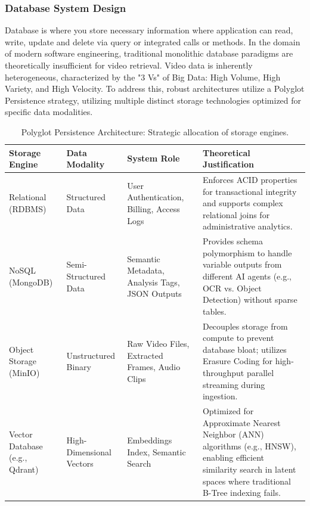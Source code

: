 \subsubsection{Database System Design}
Database is where you store necessary information where application can read, write, update and delete via query or integrated calls or methods. In the domain of modern software engineering, traditional monolithic database paradigms are theoretically insufficient for video retrieval. Video data is inherently heterogeneous, characterized by the "3 Vs" of Big Data: High Volume, High Variety, and High Velocity. To address this, robust architectures utilize a Polyglot Persistence strategy, utilizing multiple distinct storage technologies optimized for specific data modalities.

\begin{table}[h]
    \centering
    \caption{Polyglot Persistence Architecture: Strategic allocation of storage engines.}
    \label{tab:polyglot_db}
    \renewcommand{\arraystretch}{1.5} %
    \small %
    \begin{tabularx}{\textwidth}{|p{2.0cm}|p{2.0cm}|X|X|}
    \hline
    \textbf{Storage Engine} & \textbf{Data Modality} & \textbf{System Role} & \textbf{Theoretical Justification} \\
    \hline
    Relational (RDBMS) & Structured Data & User Authentication, Billing, Access Logs & Enforces ACID properties for transactional integrity and supports complex relational joins for administrative analytics. \\
    \hline
    NoSQL (MongoDB) & Semi-Structured Data & Semantic Metadata, Analysis Tags, JSON Outputs & Provides schema polymorphism to handle variable outputs from different AI agents (e.g., OCR vs. Object Detection) without sparse tables. \\
    \hline
    Object Storage (MinIO) & Unstructured Binary & Raw Video Files, Extracted Frames, Audio Clips & Decouples storage from compute to prevent database bloat; utilizes Erasure Coding for high-throughput parallel streaming during ingestion. \\
    \hline
    Vector Database (e.g., Qdrant) & High-Dimensional Vectors & Embeddings Index, Semantic Search & Optimized for Approximate Nearest Neighbor (ANN) algorithms (e.g., HNSW), enabling efficient similarity search in latent spaces where traditional B-Tree indexing fails. \\
    \hline
    \end{tabularx}
\end{table}




